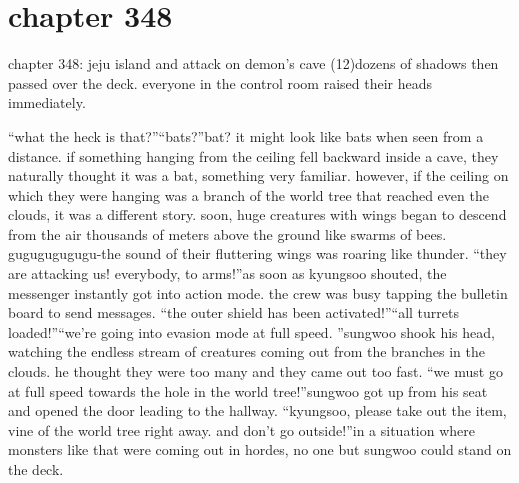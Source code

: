 \section{chapter 348}

chapter 348: jeju island and attack on demon’s cave (12)dozens of shadows then passed over the deck.
 everyone in the control room raised their heads immediately.





“what the heck is that?”“bats?”bat? it might look like bats when seen from a distance.
 if something hanging from the ceiling fell backward inside a cave, they naturally thought it was a bat, something very familiar.
however, if the ceiling on which they were hanging was a branch of the world tree that reached even the clouds, it was a different story.
soon, huge creatures with wings began to descend from the air thousands of meters above the ground like swarms of bees.
gugugugugugu-the sound of their fluttering wings was roaring like thunder.
“they are attacking us! everybody, to arms!”as soon as kyungsoo shouted, the messenger instantly got into action mode.
the crew was busy tapping the bulletin board to send messages.
“the outer shield has been activated!”“all turrets loaded!”“we’re going into evasion mode at full speed.
”sungwoo shook his head, watching the endless stream of creatures coming out from the branches in the clouds.
 he thought they were too many and they came out too fast.
“we must go at full speed towards the hole in the world tree!”sungwoo got up from his seat and opened the door leading to the hallway.
“kyungsoo, please take out the item, vine of the world tree right away.
 and don’t go outside!”in a situation where monsters like that were coming out in hordes, no one but sungwoo could stand on the deck.

